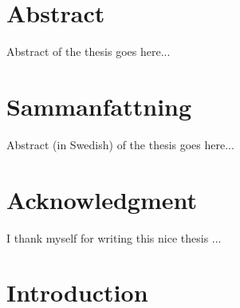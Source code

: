 \documentclass[a4paper]{report}
\begin{document}

\makeititle {}
\clearpage
\thispagestyle{empty}
\phantom{a}
\addtocounter{page}{-1}

\chapter*{Abstract}

\thispagestyle{empty}

Abstract of the thesis goes here...

\addtocounter{page}{-1}
\chapter*{Sammanfattning}

\thispagestyle{empty}

Abstract (in Swedish) of the thesis goes here...

\addtocounter{page}{-1}
\chapter*{Acknowledgment}
\thispagestyle{empty}

I thank myself for writing this nice thesis ...

\addtocounter{page}{-1}

\tableofcontents

\chapter{Introduction}
\end{document}
